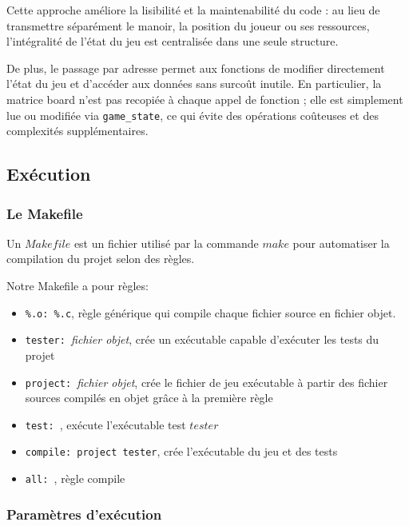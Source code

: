 Cette approche améliore la lisibilité et la maintenabilité du code : au lieu de transmettre séparément le manoir, la position du joueur ou ses ressources, l’intégralité de l’état du jeu est centralisée dans une seule structure.

De plus, le passage par adresse permet aux fonctions de modifier directement l’état du jeu et d’accéder aux données sans surcoût inutile. En particulier, la matrice board n’est pas recopiée à chaque appel de fonction ; elle est simplement lue ou modifiée via \texttt{game\_state}, ce qui évite des opérations coûteuses et des complexités supplémentaires.

\subsection{Exécution}

\subsubsection{Le Makefile}

Un $Makefile$ est un fichier utilisé par la commande $make$ pour automatiser la compilation du projet selon des règles. 

Notre Makefile a pour règles:
\begin{itemize}
    \item \texttt{\%.o: \%.c}, règle générique qui compile chaque fichier source en fichier objet.
    \item \texttt{tester: }\textit{fichier objet}, crée un exécutable capable d'exécuter les tests du projet
    \item \texttt{project: }\textit{fichier objet}, crée le fichier de jeu exécutable à partir des fichier sources compilés en objet grâce à la première règle
    \item \texttt{test: }, exécute l'exécutable test $tester$
    \item \texttt{compile: project tester}, crée l'exécutable du jeu et des tests
    \item \texttt{all: }, règle compile
\end{itemize}

\subsubsection{Paramètres d'exécution}

